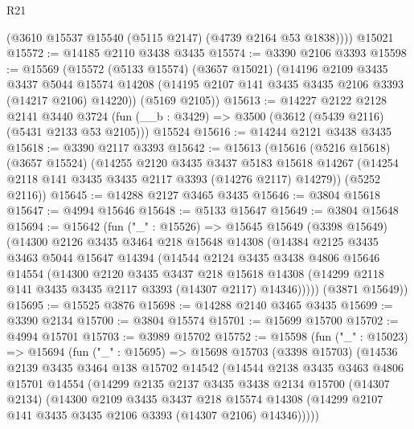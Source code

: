 \begin{lexlean}{R21}
\begin{coremodule}
        (@3610 @15537 @15540 (@5115 @2147) (@4739 @2164 @53 @1838))))
    @15021
@15572 := @14185 @2110 @3438 @3435
@15574 := @3390 @2106 @3393
@15598 := @15569
    (@15572
      (@5133 @15574)
      (@3657 @15021)
      (@14196
        @2109
        @3435
        @3437
        @5044
        @15574
        @14208
        (@14195 @2107 @141 @3435 @3435 @2106 @3393 (@14217 @2106) @14220))
      (@5169 @2105))
@15613 := @14227
    @2122
    @2128
    @2141
    @3440
    @3724
    (fun (__b : @3429) => @3500 (@3612 (@5439 @2116) (@5431 @2133 @53 @2105)))
    @15524
@15616 := @14244 @2121 @3438 @3435
@15618 := @3390 @2117 @3393
@15642 := @15613
    (@15616
      (@5216 @15618)
      (@3657 @15524)
      (@14255
        @2120
        @3435
        @3437
        @5183
        @15618
        @14267
        (@14254 @2118 @141 @3435 @3435 @2117 @3393 (@14276 @2117) @14279))
      (@5252 @2116))
@15645 := @14288 @2127 @3465 @3435
@15646 := @3804 @15618
@15647 := @4994 @15646
@15648 := @5133 @15647
@15649 := @3804 @15648
@15694 := @15642
    (fun ("_" : @15526) =>
    @15645
      @15649
      (@3398 @15649)
      (@14300
        @2126
        @3435
        @3464
        @218
        @15648
        @14308
        (@14384
          @2125
          @3435
          @3463
          @5044
          @15647
          @14394
          (@14544
            @2124
            @3435
            @3438
            @4806
            @15646
            @14554
            (@14300
              @2120
              @3435
              @3437
              @218
              @15618
              @14308
              (@14299 @2118 @141 @3435 @3435 @2117 @3393 (@14307 @2117) @14346)))))
      (@3871 @15649))
@15695 := @15525 @3876
@15698 := @14288 @2140 @3465 @3435
@15699 := @3390 @2134
@15700 := @3804 @15574
@15701 := @15699 @15700
@15702 := @4994 @15701
@15703 := @3989 @15702
@15752 := @15598
    (fun ("_" : @15023) =>
    @15694
      (fun ("_" : @15695) =>
      @15698
        @15703
        (@3398 @15703)
        (@14536
          @2139
          @3435
          @3464
          @138
          @15702
          @14542
          (@14544
            @2138
            @3435
            @3463
            @4806
            @15701
            @14554
            (@14299
              @2135
              @2137
              @3435
              @3438
              @2134
              @15700
              (@14307 @2134)
              (@14300
                @2109
                @3435
                @3437
                @218
                @15574
                @14308
                (@14299 @2107 @141 @3435 @3435 @2106 @3393 (@14307 @2106) @14346)))))

\end{coremodule}
\end{lexlean}
